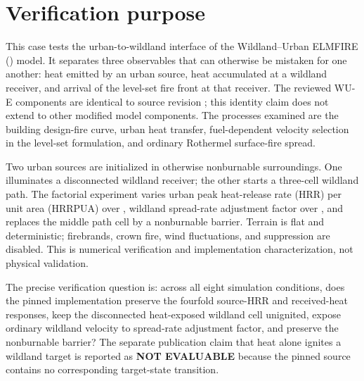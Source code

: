 \section{Verification purpose}

This case tests the urban-to-wildland interface of the Wildland--Urban ELMFIRE
(\WUE{}) model.  It separates three observables that can otherwise be
mistaken for one another: heat emitted by an urban source, heat accumulated at
a wildland receiver, and arrival of the level-set fire front at that receiver.
The reviewed WU-E components are identical to source revision
\SourceRevision{}; this identity claim does not extend to other modified
model components. The processes examined are the building design-fire curve,
urban heat transfer, fuel-dependent velocity selection in the level-set
formulation, and ordinary Rothermel surface-fire spread.

Two urban sources are initialized in otherwise nonburnable surroundings.  One
illuminates a disconnected wildland receiver; the other starts a three-cell
wildland path.  The factorial experiment varies urban peak heat-release rate (HRR) per unit area (HRRPUA) over
\PeakSet{}, wildland spread-rate adjustment factor over \AdjustmentSet{}, and replaces the
middle path cell by a nonburnable barrier.  Terrain is flat and deterministic;
firebrands, crown fire, wind fluctuations, and suppression are disabled.  This
is numerical verification and implementation characterization, not physical
validation.

The precise verification question is: across all eight simulation conditions, does the
pinned implementation preserve the fourfold source-HRR and received-heat
responses, keep the disconnected heat-exposed wildland cell unignited, expose
ordinary wildland velocity to spread-rate adjustment factor, and preserve the nonburnable
barrier?  The separate publication claim that heat alone ignites a wildland
target is reported as \textbf{NOT EVALUABLE} because the pinned source contains
no corresponding target-state transition.

\ReportOverview


